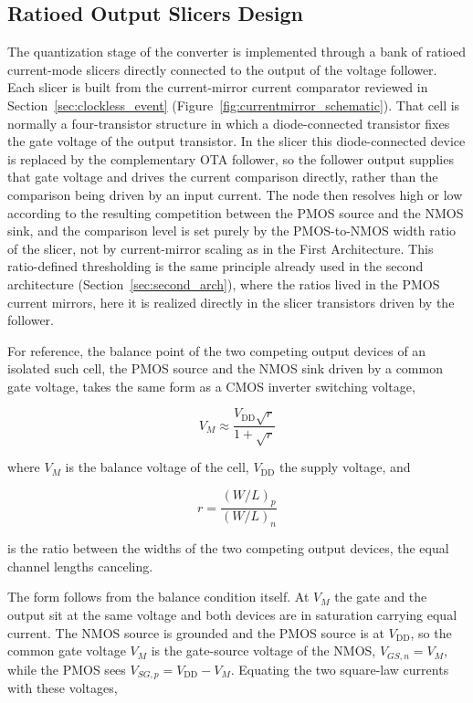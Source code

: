 \subsection{Ratioed Output Slicers Design}
\label{subsec:ratioed_slicers}

The quantization stage of the converter is implemented through a bank of ratioed current-mode slicers directly connected to the output of the voltage follower. Each slicer is built from the current-mirror current comparator reviewed in Section~\ref{sec:clockless_event} (Figure~\ref{fig:currentmirror_schematic}). That cell is normally a four-transistor structure in which a diode-connected transistor fixes the gate voltage of the output transistor. In the slicer this diode-connected device is replaced by the complementary OTA follower, so the follower output supplies that gate voltage and drives the current comparison directly, rather than the comparison being driven by an input current. The node then resolves high or low according to the resulting competition between the PMOS source and the NMOS sink, and the comparison level is set purely by the PMOS-to-NMOS width ratio of the slicer, not by current-mirror scaling as in the First Architecture. This ratio-defined thresholding is the same principle already used in the second architecture (Section~\ref{sec:second_arch}), where the ratios lived in the PMOS current mirrors, here it is realized directly in the slicer transistors driven by the follower.

For reference, the balance point of the two competing output devices of an isolated such cell, the PMOS source and the NMOS sink driven by a common gate voltage, takes the same form as a CMOS inverter switching voltage,

\begin{equation}
V_M \approx
\frac{V_\mathrm{DD}\sqrt{r}}
{1+\sqrt{r}}
\label{eq:trip_point}
\end{equation}

where $V_M$ is the balance voltage of the cell, $V_\mathrm{DD}$ the supply voltage, and

\[
r=\frac{(W/L)_p}{(W/L)_n}
\]

is the ratio between the widths of the two competing output devices, the equal channel lengths canceling.

The form follows from the balance condition itself. At $V_M$ the gate and the output sit at the same voltage and both devices are in saturation carrying equal current. The NMOS source is grounded and the PMOS source is at $V_\mathrm{DD}$, so the common gate voltage $V_M$ is the gate-source voltage of the NMOS, $V_{GS,n} = V_M$, while the PMOS sees $V_{SG,p} = V_\mathrm{DD} - V_M$. Equating the two square-law currents with these voltages,

